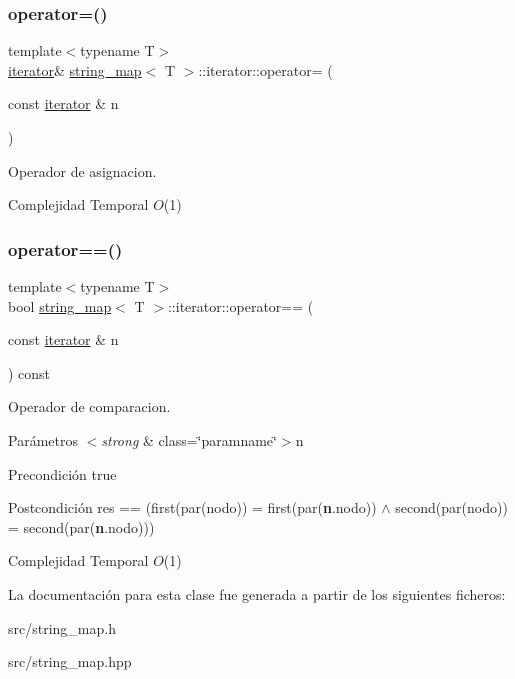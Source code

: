 \subsubsection{\texorpdfstring{operator=()}{operator=()}}
{\footnotesize\ttfamily template$<$typename T$>$ \\
\mbox{\hyperlink{classstring__map_1_1iterator}{iterator}}\& \mbox{\hyperlink{classstring__map}{string\+\_\+map}}$<$ T $>$\+::iterator\+::operator= (\begin{DoxyParamCaption}\item[{const \mbox{\hyperlink{classstring__map_1_1iterator}{iterator}} \&}]{n }\end{DoxyParamCaption})\hspace{0.3cm}{\ttfamily [inline]}}



Operador de asignacion. 


\begin{DoxyDescription}
\item[Complejidad Temporal]$O$(1)
\end{DoxyDescription}\mbox{\label{classstring__map_1_1iterator_a78fea15b5e6288434dbb4876e07b5eaa}} 
\subsubsection{\texorpdfstring{operator==()}{operator==()}}
{\footnotesize\ttfamily template$<$typename T$>$ \\
bool \mbox{\hyperlink{classstring__map}{string\+\_\+map}}$<$ T $>$\+::iterator\+::operator== (\begin{DoxyParamCaption}\item[{const \mbox{\hyperlink{classstring__map_1_1iterator}{iterator}} \&}]{n }\end{DoxyParamCaption}) const\hspace{0.3cm}{\ttfamily [inline]}}



Operador de comparacion. 


\begin{DoxyParams}{Parámetros}
{\em $<$strong} & class=\char`\"{}paramname\char`\"{}$>$n\\
\hline
\end{DoxyParams}
\begin{DoxyPrecond}{Precondición}
true 
\end{DoxyPrecond}
\begin{DoxyPostcond}{Postcondición}
res == (first(par(nodo)) = first(par({\bfseries n}.nodo)) $\land$ second(par(nodo)) = second(par({\bfseries n}.nodo)))
\end{DoxyPostcond}

\begin{DoxyDescription}
\item[Complejidad Temporal]$O$(1)
\end{DoxyDescription}

La documentación para esta clase fue generada a partir de los siguientes ficheros\+:\begin{DoxyCompactItemize}
\item 
src/string\+\_\+map.\+h\item 
src/string\+\_\+map.\+hpp\end{DoxyCompactItemize}
